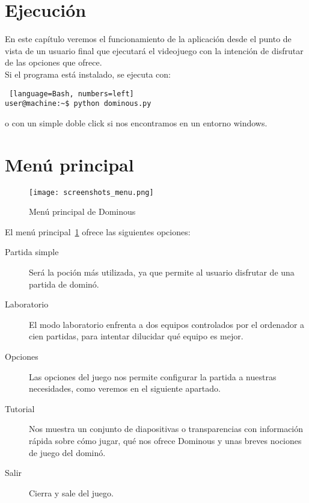 



\section{Ejecución}

En este capítulo veremos el funcionamiento de la aplicación desde el punto de vista de un usuario final que ejecutará el
videojuego con la intención de disfrutar de las opciones que ofrece. \\

Si el programa está instalado, se ejecuta con:

\begin{lstlisting} [language=Bash, numbers=left]
user@machine:~$ python dominous.py
\end{lstlisting}

o con un simple doble click si nos encontramos en un entorno windows. \\


\section{Menú principal}

\begin{figure}[h]
  \label{fig:screenshots_menu}
  \begin{center}
    \texttt{[image: screenshots\_menu.png]}
  \end{center}
  \caption{Menú principal de Dominous}
\end{figure}

El menú principal~\ref{fig:screenshots_menu} ofrece las siguientes opciones:

\begin{description}
    \item[Partida simple] Será la poción más utilizada, ya que permite al usuario disfrutar de una partida de dominó.
    \item[Laboratorio] El modo laboratorio enfrenta a dos equipos controlados por el ordenador a cien partidas, para
            intentar dilucidar qué equipo es mejor.
    \item[Opciones] Las opciones del juego nos permite configurar la partida a nuestras necesidades, como veremos en el
            siguiente apartado.
    \item[Tutorial] Nos muestra un conjunto de diapositivas o transparencias con información rápida sobre cómo jugar,
            qué nos ofrece Dominous y unas breves nociones de juego del dominó.
    \item[Salir] Cierra y sale del juego.
\end{description}

